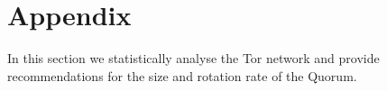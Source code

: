\documentclass[USenglish,oneside,twocolumn]{article}
\begin{document}
%
%
%

\section{Appendix}

In this section we statistically analyse the Tor network and provide recommendations for the size and rotation rate of the Quorum.
\end{document}
